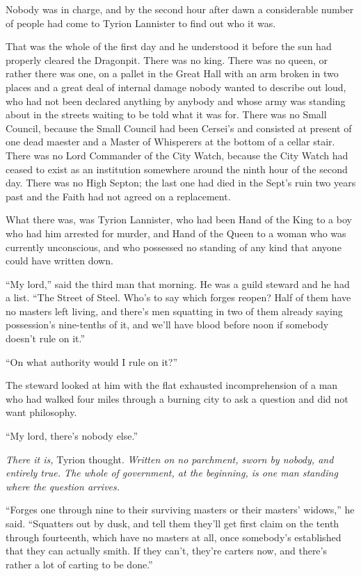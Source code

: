 Nobody was in charge, and by the second hour after dawn a considerable number of people had come to Tyrion Lannister to find out who it was.

That was the whole of the first day and he understood it before the sun had properly cleared the Dragonpit. There was no king. There was no queen, or rather there was one, on a pallet in the Great Hall with an arm broken in two places and a great deal of internal damage nobody wanted to describe out loud, who had not been declared anything by anybody and whose army was standing about in the streets waiting to be told what it was for. There was no Small Council, because the Small Council had been Cersei’s and consisted at present of one dead maester and a Master of Whisperers at the bottom of a cellar stair. There was no Lord Commander of the City Watch, because the City Watch had ceased to exist as an institution somewhere around the ninth hour of the second day. There was no High Septon; the last one had died in the Sept’s ruin two years past and the Faith had not agreed on a replacement.

What there was, was Tyrion Lannister, who had been Hand of the King to a boy who had him arrested for murder, and Hand of the Queen to a woman who was currently unconscious, and who possessed no standing of any kind that anyone could have written down.

“My lord,” said the third man that morning. He was a guild steward and he had a list. “The Street of Steel. Who’s to say which forges reopen? Half of them have no masters left living, and there’s men squatting in two of them already saying possession’s nine-tenths of it, and we’ll have blood before noon if somebody doesn’t rule on it.”

“On what authority would I rule on it?”

The steward looked at him with the flat exhausted incomprehension of a man who had walked four miles through a burning city to ask a question and did not want philosophy.

“My lord, there’s nobody else.”

\textit{There it is,} Tyrion thought. \textit{Written on no parchment, sworn by nobody, and entirely true. The whole of government, at the beginning, is one man standing where the question arrives.}

“Forges one through nine to their surviving masters or their masters’ widows,” he said. “Squatters out by dusk, and tell them they’ll get first claim on the tenth through fourteenth, which have no masters at all, once somebody’s established that they can actually smith. If they can’t, they’re carters now, and there’s rather a lot of carting to be done.”


